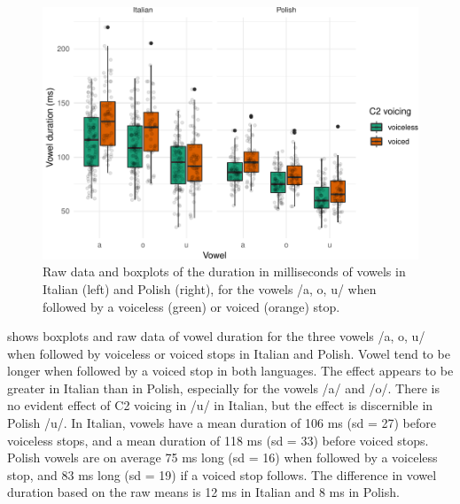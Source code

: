 \documentclass[preprint]{JASAnew}
\begin{document}
\begin{figure}
\includegraphics[width=\linewidth]{2018-jasa_files/figure-latex/vowels-plot-1} \caption{Raw data and boxplots of the duration in milliseconds of vowels in Italian (left) and Polish (right), for the vowels /a, o, u/ when followed by a voiceless (green) or voiced (orange) stop. }\label{f:vowels-plot}
\end{figure}

 shows boxplots and raw data of vowel duration for
the three vowels /a, o, u/ when followed by voiceless or voiced stops in
Italian and Polish. Vowel tend to be longer when followed by a voiced
stop in both languages. The effect appears to be greater in Italian than
in Polish, especially for the vowels /a/ and /o/. There is no evident
effect of C2 voicing in /u/ in Italian, but the effect is discernible in
Polish /u/. In Italian, vowels have a mean duration of 106 ms (sd = 27)
before voiceless stops, and a mean duration of 118 ms (sd = 33) before
voiced stops. Polish vowels are on average 75 ms long (sd = 16) when
followed by a voiceless stop, and 83 ms long (sd = 19) if a voiced stop
follows. The difference in vowel duration based on the raw means is 12
ms in Italian and 8 ms in Polish.
\end{document}
